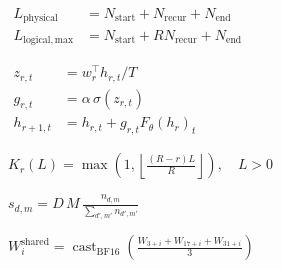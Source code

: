 \documentclass[12pt]{article}
\begin{document}
\begin{preview}
\(\displaystyle
\begin{aligned}
L_{\mathrm{physical}} &= N_{\mathrm{start}} + N_{\mathrm{recur}} + N_{\mathrm{end}} \\
L_{\mathrm{logical,max}} &= N_{\mathrm{start}} + R N_{\mathrm{recur}} + N_{\mathrm{end}}
\end{aligned}
\)
\end{preview}
\begin{preview}
\(\displaystyle
\begin{aligned}
z_{r,t} &= w_r^{\top} h_{r,t} / T \\
g_{r,t} &= \alpha\,\sigma(z_{r,t}) \\
h_{r+1,t} &= h_{r,t} + g_{r,t} F_{\theta}(h_r)_t
\end{aligned}
\)
\end{preview}
\begin{preview}
\(\displaystyle
K_r(L)=\max\left(1,\left\lfloor\frac{(R-r)L}{R}\right\rfloor\right),\quad L>0
\)
\end{preview}
\begin{preview}
\(\displaystyle
s_{d,m}=D\,M\,\frac{n_{d,m}}{\sum_{d',m'}n_{d',m'}}
\)
\end{preview}
\begin{preview}
\(\displaystyle
W^{\mathrm{shared}}_i=\operatorname{cast}_{\mathrm{BF16}}
\left(\frac{W_{3+i}+W_{17+i}+W_{31+i}}{3}\right)
\)
\end{preview}
\end{document}
